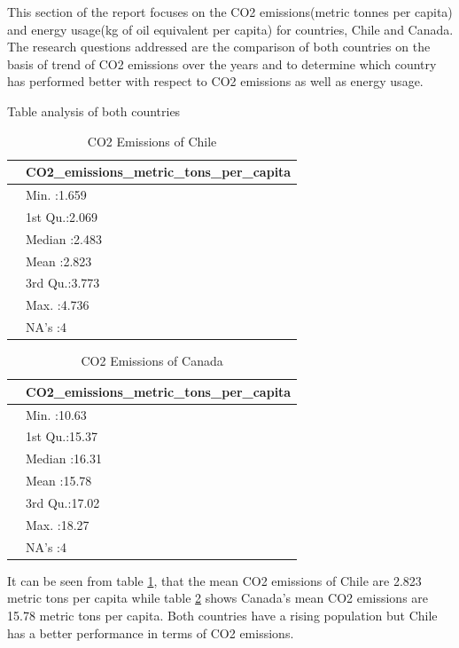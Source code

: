 \documentclass[11pt,a4paper,]{article}
\begin{document}
This section of the report focuses on the CO2 emissions(metric tonnes per capita) and energy usage(kg of oil equivalent per capita) for countries, Chile and Canada. The research questions addressed are the comparison of both countries on the basis of trend of CO2 emissions over the years and to determine which country has performed better with respect to CO2 emissions as well as energy usage.

Table analysis of both countries

\begin{table}[!h]

\caption{\label{tab:chile}CO2 Emissions of Chile}
\centering
\begin{tabular}[t]{l|l}
\hline
  & CO2\_emissions\_metric\_tons\_per\_capita\\
\hline
 & Min.   :1.659\\
\hline
 & 1st Qu.:2.069\\
\hline
 & Median :2.483\\
\hline
 & Mean   :2.823\\
\hline
 & 3rd Qu.:3.773\\
\hline
 & Max.   :4.736\\
\hline
 & NA's   :4\\
\hline
\end{tabular}
\end{table}

\begin{table}[!h]

\caption{\label{tab:canada}CO2 Emissions of Canada}
\centering
\begin{tabular}[t]{l|l}
\hline
  & CO2\_emissions\_metric\_tons\_per\_capita\\
\hline
 & Min.   :10.63\\
\hline
 & 1st Qu.:15.37\\
\hline
 & Median :16.31\\
\hline
 & Mean   :15.78\\
\hline
 & 3rd Qu.:17.02\\
\hline
 & Max.   :18.27\\
\hline
 & NA's   :4\\
\hline
\end{tabular}
\end{table}

It can be seen from table \ref{tab:chile}, that the mean CO2 emissions of Chile are 2.823 metric tons per capita while table \ref{tab:canada} shows Canada's mean CO2 emissions are 15.78 metric tons per capita. Both countries have a rising population but Chile has a better performance in terms of CO2 emissions.
\end{document}

